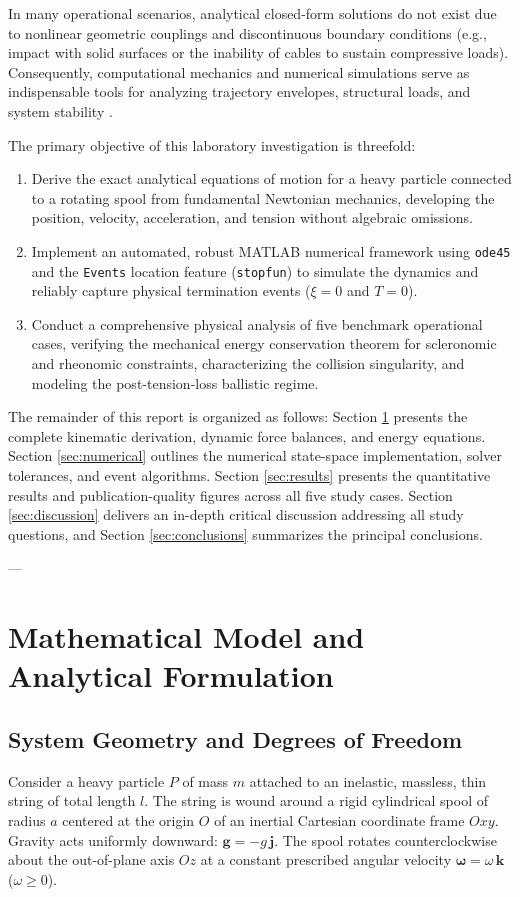 \documentclass[11pt,a4paper]{article}
\begin{document}
In many operational scenarios, analytical closed-form solutions do not exist due to nonlinear geometric couplings and discontinuous boundary conditions (e.g., impact with solid surfaces or the inability of cables to sustain compressive loads). Consequently, computational mechanics and numerical simulations serve as indispensable tools for analyzing trajectory envelopes, structural loads, and system stability \cite{dormand1980family}.

The primary objective of this laboratory investigation is threefold:
\begin{enumerate}
    \item Derive the exact analytical equations of motion for a heavy particle connected to a rotating spool from fundamental Newtonian mechanics, developing the position, velocity, acceleration, and tension without algebraic omissions.
    \item Implement an automated, robust MATLAB numerical framework using \texttt{ode45} and the \texttt{Events} location feature (\texttt{stopfun}) to simulate the dynamics and reliably capture physical termination events ($\xi = 0$ and $T = 0$).
    \item Conduct a comprehensive physical analysis of five benchmark operational cases, verifying the mechanical energy conservation theorem for scleronomic and rheonomic constraints, characterizing the collision singularity, and modeling the post-tension-loss ballistic regime.
\end{enumerate}

The remainder of this report is organized as follows: Section \ref{sec:methodology} presents the complete kinematic derivation, dynamic force balances, and energy equations. Section \ref{sec:numerical} outlines the numerical state-space implementation, solver tolerances, and event algorithms. Section \ref{sec:results} presents the quantitative results and publication-quality figures across all five study cases. Section \ref{sec:discussion} delivers an in-depth critical discussion addressing all study questions, and Section \ref{sec:conclusions} summarizes the principal conclusions.

---

\section{Mathematical Model and Analytical Formulation}
\label{sec:methodology}

\subsection{System Geometry and Degrees of Freedom}
Consider a heavy particle $P$ of mass $m$ attached to an inelastic, massless, thin string of total length $l$. The string is wound around a rigid cylindrical spool of radius $a$ centered at the origin $O$ of an inertial Cartesian coordinate frame $Oxy$. Gravity acts uniformly downward: $\mathbf{g} = -g\,\mathbf{j}$. The spool rotates counterclockwise about the out-of-plane axis $Oz$ at a constant prescribed angular velocity $\boldsymbol{\omega} = \omega\,\mathbf{k}$ ($\omega \ge 0$).
\end{document}
